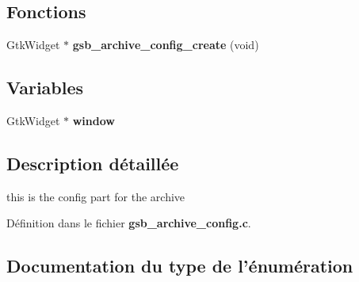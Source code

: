 \subsection*{Fonctions}
\begin{DoxyCompactItemize}
\item 
GtkWidget $\ast$ {\bf gsb\_\-archive\_\-config\_\-create} (void)
\end{DoxyCompactItemize}
\subsection*{Variables}
\begin{DoxyCompactItemize}
\item 
GtkWidget $\ast$ {\bf window}
\end{DoxyCompactItemize}


\subsection{Description détaillée}
this is the config part for the archive 

Définition dans le fichier {\bf gsb\_\-archive\_\-config.c}.



\subsection{Documentation du type de l'énumération}
